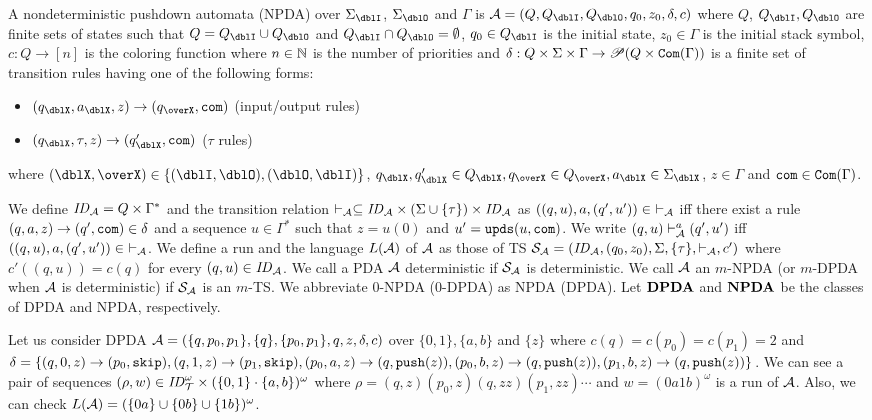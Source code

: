 \begin{definition}
A nondeterministic {pushdown automata} (NPDA) over $\Sigma_\dblI$, $\Sigma_\dblO$ and $\Gamma$ is $\calA = (Q, Q_\dblI, Q_\dblO, q_0, z_0, \delta, c)$ where
$Q$, $Q_\dblI, Q_\dblO$ are finite sets of states such that $Q=Q_\dblI\cup Q_\dblO$ and $Q_\dblI \cap Q_\dblO = \emptyset$,
$q_0\in Q_\dblI$ is the initial state,
$z_0\in \Gamma$ is the initial stack symbol,
$c: Q \to [n]$ is the coloring function where $n\in \mathbb{N}$ is the number of priorities and
$\delta: Q \times \Sigma \times \Gamma \to \mathscr{P}(Q \times \mathtt{Com}(\Gamma))$ is a finite set of transition rules having one of the following forms:
\begin{itemize}
\item $(q_\dblX, a_\dblX, z) \rightarrow (q_\overX, \com)$ (input/output rules)
\item $(q_\dblX, \tau, z)\to(q'_\dblX,\com)$ ($\tau$ rules)
\end{itemize}
where $(\dblX, \overX)\in\{(\dblI, \dblO), (\dblO,\dblI)\}$,
$q_\dblX, q'_\dblX\in Q_\dblX, q_\overX\in Q_\overX, a_\dblX\in \Sigma_\dblX$, $z\in \Gamma$ and $\mathtt{com}\in \mathtt{Com}(\Gamma)$.
\end{definition}
We define $\mathit{ID}_{\cal A}= Q\times \Gamma^*$ and
the transition relation $\vdash_{\cal A}\subseteq \mathit{ID}_{\cal A}\times (\Sigma\cup\{\tau\})\times \mathit{ID}_{\cal A}$ as
$((q,u),a,(q',u'))\in\ \vdash_{\cal A}$ iff there exist a rule $(q, a, z) \rightarrow (q', \mathtt{com}) \in \delta$ and a sequence $u\in \Gamma^*$ such that $z=u(0)$ and $u'=\mathtt{upds}(u,\mathtt{com})$.
We write $(q,u)\vdash^a_{\cal A}(q',u')$ iff
$((q,u),a,(q',u'))\in\ \vdash_{\cal A}$.
We define a run and the language $L({\cal A})$ of ${\cal A}$ as those of TS ${\cal S}_{\cal A}=(\mathit{ID}_{\cal A}, (q_0,z_0),\Sigma, \{\tau\},\vdash_{\cal A},c')$
where $c'((q,u))= c(q)$ for every $(q,u)\in\mathit{ID}_{\cal A}$.
We call a PDA ${\cal A}$ deterministic if ${\cal S}_{\cal A}$ is deterministic.
We call ${\cal A}$ an $m$-NPDA (or $m$-DPDA when ${\cal A}$ is deterministic)
if ${\cal S}_{\cal A}$ is an $m$-TS.
We abbreviate $0$-NPDA ($0$-DPDA) as NPDA (DPDA).
Let ${\bf DPDA}$ and ${\bf NPDA}$ be the classes of DPDA and NPDA, respectively.

\begin{example}
\label{ex: PDA}
Let us consider DPDA
${\cal A} = (\{q,p_0,p_1\},\{q\},\{p_0,p_1\},q,z,\delta,c)$
over $\{0,1\},\{a,b\}$ and $\{z\}$ where
$c(q)=c(p_0)=c(p_1)=2$ and
$\delta = \{
(q, 0, z) \rightarrow (p_0, \mathtt{skip}),
(q, 1, z) \rightarrow (p_1, \mathtt{skip}),
(p_0, a, z) \rightarrow (q, \mathtt{push}(z)),
(p_0, b, z) \rightarrow (q, \mathtt{push}(z)),
(p_1, b, z) \rightarrow (q, \mathtt{push}(z))
\}$.
We can see
a pair of sequences $(\rho,w)\in \mathit{ID}_{\cal T}^\omega\times (\{0,1\}\cdot\{a,b\})^\omega$ where
$\rho=(q,z)(p_0,z)(q,zz)(p_1,zz)\cdots$ and
$w=(0a1b)^\omega$
is a run of ${\cal A}$.
Also, we can check
$L({\cal A})=(\{0a\}\cup\{0b\}\cup\{1b\})^\omega$.
\end{example}


